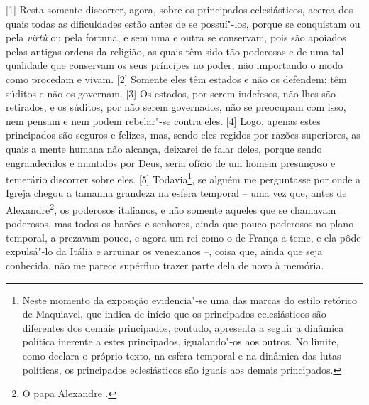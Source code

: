 
{[}1{]} Resta somente discorrer, agora, sobre os principados
eclesiásticos, acerca dos quais todas as dificuldades estão antes de se
possuí"-los, porque se conquistam ou pela \emph{virtù} ou pela fortuna, e
sem uma e outra se conservam, pois são apoiados pelas antigas ordens da
religião, as quais têm sido tão poderosas e de uma tal qualidade que
conservam os seus príncipes no poder, não importando o modo como
procedam e vivam. {[}2{]} Somente eles têm estados e não os defendem;
têm súditos e não os governam. {[}3{]} Os estados, por serem indefesos,
não lhes são retirados, e os súditos, por não serem governados, não se
preocupam com isso, nem pensam e nem podem rebelar"-se contra eles.
{[}4{]} Logo, apenas estes principados são seguros e felizes, mas, sendo
eles regidos por razões superiores, as quais a mente humana não alcança,
deixarei de falar deles, porque sendo engrandecidos e mantidos por Deus,
seria ofício de um homem presunçoso e temerário discorrer sobre eles.
{[}5{]} Todavia\footnote{Neste momento da exposição evidencia"-se uma das
  marcas do estilo retórico de Maquiavel, que indica de início que os
  principados eclesiásticos são diferentes dos demais principados,
  contudo, apresenta a seguir a dinâmica política inerente a estes
  principados, igualando"-os aos outros. No limite, como declara o
  próprio texto, na esfera temporal e na dinâmica das lutas políticas,
  os principados eclesiásticos são iguais aos demais principados.}, se
alguém me perguntasse por onde a Igreja chegou a tamanha grandeza na
esfera temporal -- uma vez que, antes de Alexandre\footnote{O papa
  Alexandre .}, os poderosos italianos, e não somente aqueles que se
chamavam poderosos, mas todos os barões e senhores, ainda que pouco
poderosos no plano temporal, a prezavam pouco, e agora um rei como o de
França a teme, e ela pôde expulsá"-lo da Itália e arruinar os venezianos
--, coisa que, ainda que seja conhecida, não me parece supérfluo trazer
parte dela de novo à memória.

